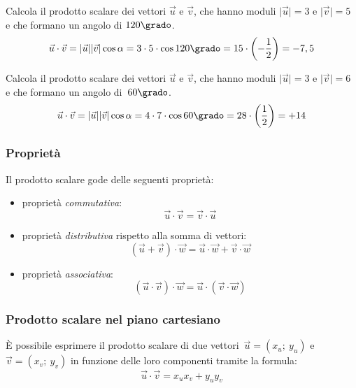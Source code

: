  \begin{esempio}
  Calcola il prodotto scalare dei  vettori $\vec{u}$ e $\vec{v}$, 
  che hanno moduli $\lvert\vec{u}\rvert= 3 \text{ e } \lvert\vec{v}\rvert=5$ 
  e che formano un angolo di $120\grado$.
  \[\vec{u} \cdot \vec{v} = 
    \lvert\vec{u}\rvert\lvert\vec{v}\rvert \cos \alpha=
    3 \cdot 5 \cdot \cos 120\grado = 15 \cdot \left(-\frac{1}{2} \right)=
    -7,5\]
 \end{esempio}

 \begin{esempio}
  Calcola il prodotto scalare dei  vettori $\vec{u}$ e $\vec{v}$, 
  che hanno moduli $\lvert\vec{u}\rvert= 3 \text{ e } \lvert\vec{v}\rvert=6$ 
  e che formano un angolo di~$60\grado$.
  \[\vec{u} \cdot \vec{v} = 
    \lvert\vec{u}\rvert\lvert\vec{v}\rvert \cos \alpha=
    4 \cdot 7 \cdot \cos 60\grado = 28 \cdot \left(\frac{1}{2} \right)=
    +14\]
 \end{esempio}


\subsubsection{Proprietà}

Il prodotto scalare gode delle seguenti proprietà:
\begin{itemize}
 \item proprietà \emph{commutativa}:
  \[\vec{u} \cdot \vec{v} = \vec{v} \cdot \vec{u}\]
 \item proprietà \emph{distributiva} rispetto alla somma di vettori:
  \[\left(\vec{u} + \vec{v} \right) \cdot \vec{w} = 
    \vec{u} \cdot \vec{w} + \vec{v} \cdot \vec{w}\]
 \item proprietà \emph{associativa}:
  \[\left(\vec{u} \cdot \vec{v} \right) \cdot \vec{w} = 
    \vec{u} \cdot \left(\vec{v} \cdot \vec{w} \right)\]
\end{itemize}

\subsubsection{Prodotto scalare nel piano cartesiano}

È possibile esprimere il prodotto scalare di due 
vettori~$\vec{u}=(x_u;~y_u)$ e $\vec{v}=(x_v;~y_v)$ 
in funzione delle loro componenti tramite la formula:
\[\vec{u} \cdot \vec{v} = x_u x_v + y_u y_v\]

